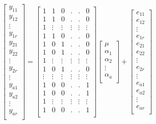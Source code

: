\documentclass[
  10pt,
]{book}
\theoremstyle{definition}
\theoremstyle{definition}
\theoremstyle{definition}
\theoremstyle{definition}
\theoremstyle{remark}
\begin{document}
\begin{equation}
\begin{bmatrix}
y_{11} \\
y_{12} \\
\vdots \\
y_{1r} \\
y_{21} \\
y_{22} \\
\vdots \\
y_{2r} \\
\vdots \\
y_{a1} \\
y_{a2} \\
\vdots \\
y_{ar} \\
\end{bmatrix} 
 =
\begin{bmatrix}
1 & 1 & 0 & . & . & 0 \\
1 & 1 & 0 & . & . & 0 \\
1 & \vdots & \vdots & \vdots & \vdots & \vdots \\
1 & 1 & 0 & . & . & 0 \\
1 & 0 & 1 & . & . & 0 \\
1 & 0 & 1 & . & . & 0 \\
1 & \vdots & \vdots & \vdots & \vdots & \vdots \\
1 & 0 & 1 & . & . & 0 \\
\vdots & \vdots & \vdots & \vdots & \vdots & \vdots \\
1 & 0 & 0 & . & . & 1 \\
1 & 0 & 0 & . & . & 1 \\
1 & \vdots & \vdots & \vdots & \vdots & \vdots \\
1 & 0 & 0 & . & . & 1 \\
\end{bmatrix}
\begin{bmatrix}
\mu \\
\alpha_{1} \\
\alpha_{2} \\
\vdots \\
\alpha_{a} \\
\end{bmatrix} +
\begin{bmatrix}
e_{11} \\
e_{12} \\
\vdots \\
e_{1r} \\
e_{21} \\
e_{22} \\
\vdots \\
e_{2r} \\
\vdots \\
e_{a1} \\
e_{a2} \\
\vdots \\
e_{ar} \\
\end{bmatrix}
\label{eq:lm2}
\end{equation}
\end{document}
